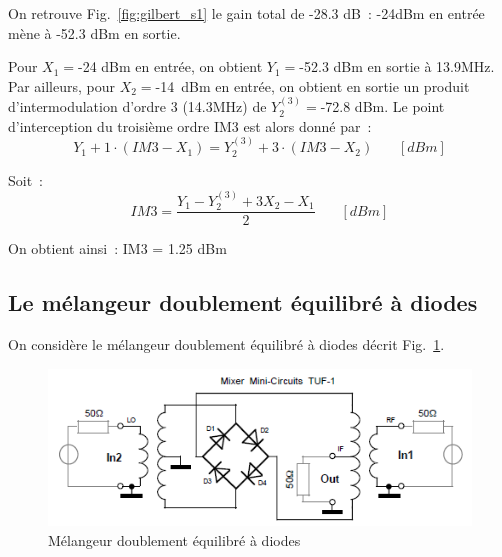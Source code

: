 \documentclass{article}
\begin{document}
On retrouve Fig.~\ref{fig:gilbert_s1} le gain total de -28.3 dB~: -24dBm en entrée mène à -52.3 dBm en sortie.

Pour $X_1 = $-24 dBm en entrée, on obtient $Y_1 = $-52.3 dBm en sortie à 13.9MHz. Par ailleurs, pour $X_2 = $-14~dBm en entrée, on obtient en sortie un produit d'intermodulation d'ordre 3 (14.3MHz) de $Y_2^{(3)} = $-72.8 dBm. Le point d'interception du troisième ordre IM3 est alors donné par~:
\begin{equation*}
Y_1 + 1\cdot(IM3-X_1) = Y_2^{(3)}+3\cdot(IM3-X_2)~~~~~~~~[dBm]
\end{equation*}

Soit~: 
\begin{equation*}
IM3=\frac{Y_1 - Y_2^{(3)} + 3 X_2 - X_1}{2}~~~~~~~~[dBm]
\end{equation*}

On obtient ainsi~: IM3 = 1.25 dBm

%



\subsection{Le mélangeur doublement équilibré à diodes}

On considère le mélangeur doublement équilibré à diodes décrit Fig.~\ref{fig:schema_melangeur_doublediode}.

\begin{figure}[h!]
	\centering
	\includegraphics[width=.7\textwidth]{schema_melangeur_doublediode}
	\caption{Mélangeur doublement équilibré à diodes}
	\label{fig:schema_melangeur_doublediode}
\end{figure}
\end{document}
